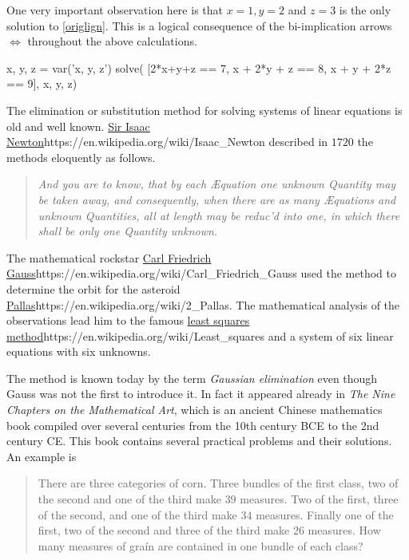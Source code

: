 \documentclass{article}
\begin{document}
\begin{example}[showhide]
One very important observation here is that $x=1, y=2$ and $z=3$ is the only
solution to  \eqref{origlign}. This is a logical consequence of the
bi-implication arrows $\iff$ throughout the above calculations.

\begin{sage}
x, y, z = var('x, y, z')
solve(
[2*x+y+z == 7,
x + 2*y + z == 8,
x + y + 2*z == 9],
x, y, z)
\end{sage}

\end{example}




The elimination or substitution method for solving systems of linear equations
is old and well known.
\url{Sir Isaac Newton}{https://en.wikipedia.org/wiki/Isaac_Newton} described in $1720$
the methods eloquently as follows.

\begin{quote}
  \emph{And you are to know, that by each Æquation one unknown Quantity may
  be taken away, and consequently, when there are as many Æquations
  and unknown Quantities, all at length may be reduc'd into one, in
  which there shall be only one Quantity unknown.}
\end{quote}


The mathematical rockstar \url{Carl Friedrich
  Gauss}{https://en.wikipedia.org/wiki/Carl_Friedrich_Gauss} used the method
to determine the orbit for the asteroid
\url{Pallas}{https://en.wikipedia.org/wiki/2_Pallas}. The mathematical analysis
of the observations lead him to the famous \url{least squares method}{https://en.wikipedia.org/wiki/Least_squares} and
a system of six linear equations with six unknowns.

The method is known today by the term \emph{Gaussian elimination} even though Gauss
was not the first to introduce it. In fact it appeared already in \emph{The Nine Chapters
  on the Mathematical Art}, which is an ancient Chinese mathematics book compiled over several
centuries from the 10th century BCE to the 2nd century CE. This book contains
several practical problems and their solutions. An example is
\begin{quote}
  There are three categories of corn. Three bundles of the first class,
  two of the second and one of the third make $39$ measures. Two of the
  first, three of the second, and one of the third make $34$ measures. Finally
  one of the first, two of the second and three of the third make $26$ measures.
  How many measures of graín are contained in one bundle of each class?
\end{quote}
\end{document}
